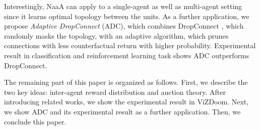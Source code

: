 Interestingly, NaaA can apply to a single-agent as well as multi-agent setting since it learns optimal topology between the units. %
As a further application, we propose {\em Adaptive DropConnect} (ADC), which combines DropConnect \citep{wan2013regularization}, which randomly masks the topology, with an adaptive algorithm, which prunes connections with less counterfactual return with higher probability.
Experimental result in classification and reinforcement learning task shows ADC outperforms DropConnect.

The remaining part of this paper is organized as follows. 
First, we describe the two key ideas: inter-agent reward distribution and auction theory. 
After introducing related works, we show the experimental result in ViZDoom.
Next, we show ADC and its experimental result as a further application. 
Then, we conclude this paper.
